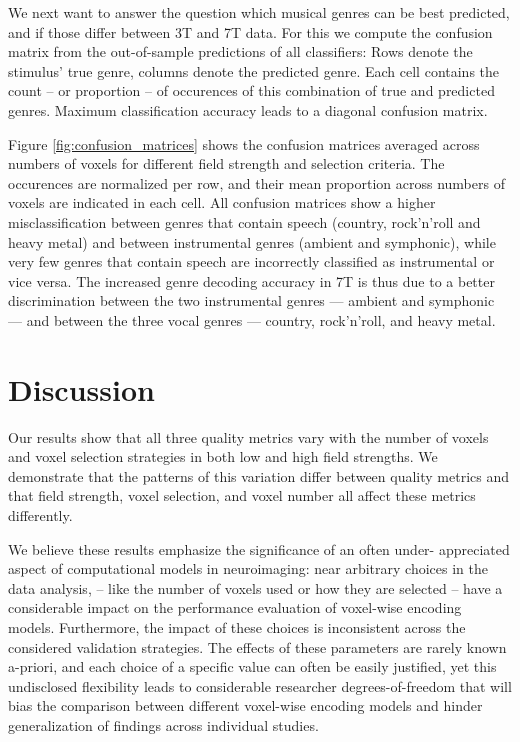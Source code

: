 We next want to answer the question which musical genres can be best predicted, and if those differ between 3T and 7T data. For this we compute the confusion matrix from the out-of-sample predictions of all classifiers: Rows denote the stimulus' true genre, columns denote the predicted genre. Each cell contains the count -- or proportion -- of occurences of this combination of true and predicted genres. Maximum classification accuracy leads to a diagonal confusion matrix.

Figure \ref{fig:confusion_matrices} shows the confusion matrices averaged across numbers of voxels for different field strength and selection criteria. The occurences are normalized per row, and their mean proportion across numbers of voxels are indicated in each cell. All confusion matrices show a higher misclassification between genres that contain speech (country, rock'n'roll and heavy metal) and between instrumental genres (ambient and symphonic), while very few genres that contain speech are incorrectly classified as instrumental or vice versa. The increased genre decoding accuracy in 7T is thus due to a better discrimination between the two instrumental genres --- ambient and symphonic --- and between the three vocal genres --- country, rock'n'roll, and heavy metal.

\section*{Discussion}

Our results show that all three quality metrics vary with the number of voxels and voxel selection strategies in both low and high field strengths. We demonstrate that the patterns of this variation differ between quality metrics and that field strength, voxel selection, and voxel number all affect these metrics differently.

We believe these results emphasize the significance of an often under- appreciated aspect of computational models in neuroimaging: near arbitrary choices in the data analysis, -- like the number of voxels used or how they are selected -- have a considerable impact on the performance evaluation of voxel-wise encoding models. Furthermore, the impact of these choices is inconsistent across the considered validation strategies. The effects of these parameters are rarely known a-priori, and each choice of a specific value can often be easily justified, yet this undisclosed flexibility leads to considerable researcher degrees-of-freedom \citep{SNS11,hong2019false} that will bias the comparison between different voxel-wise encoding models and hinder generalization of findings across individual studies.

